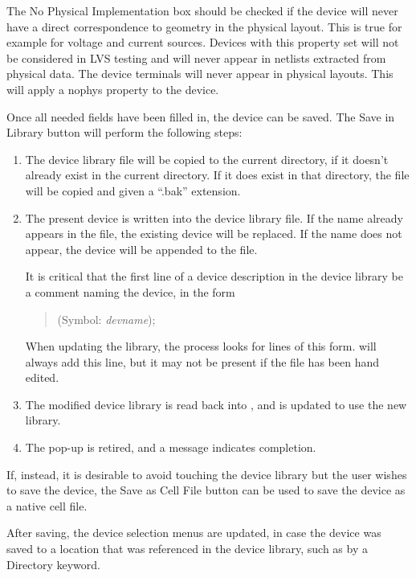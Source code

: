 The {\cb No Physical Implementation} box should be checked if the
device will never have a direct correspondence to geometry in the
physical layout.  This is true for example for voltage and current
sources.  Devices with this property set will not be considered in LVS
testing and will never appear in netlists extracted from physical
data.  The device terminals will never appear in physical layouts. 
This will apply a {\et nophys} property to the device.

Once all needed fields have been filled in, the device can be saved. 
The {\cb Save in Library} button will perform the following steps:
\begin{enumerate}
\item{The device library file will be copied to the current directory,
    if it doesn't already exist in the current directory.  If it does
    exist in that directory, the file will be copied and given a
    ``{\vt .bak}'' extension.}

\item{The present device is written into the device library file.  If
    the name already appears in the file, the existing device will be
    replaced.  If the name does not appear, the device will be
    appended to the file.

It is critical that the first line of a device description in the
device library be a comment naming the device, in the form
\begin{quote}
({\vt Symbol:} {\it devname});
\end{quote}
When updating the library, the process looks for lines of this form. 
{\Xic} will always add this line, but it may not be present if the
file has been hand edited.}

\item{The modified device library is read back into {\Xic}, and {\Xic}
    is updated to use the new library.}

\item{The pop-up is retired, and a message indicates completion.}
\end{enumerate}

If, instead, it is desirable to avoid touching the device library but
the user wishes to save the device, the {\cb Save as Cell File}
button can be used to save the device as a native cell file.

After saving, the device selection menus are updated, in case the
device was saved to a location that was referenced in the device
library, such as by a {\vt Directory} keyword.

